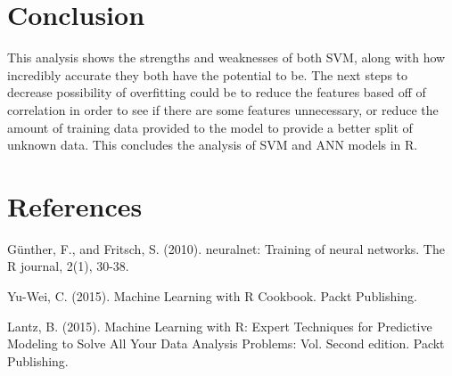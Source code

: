\documentclass[
  english,
  man]{apa6}
\begin{document}
\hypertarget{conclusion}{%
\section{Conclusion}\label{conclusion}}

This analysis shows the strengths and weaknesses of both SVM, along with how incredibly accurate they both have the potential to be. The next steps to decrease possibility of overfitting could be to reduce the features based off of correlation in order to see if there are some features unnecessary, or reduce the amount of training data provided to the model to provide a better split of unknown data. This concludes the analysis of SVM and ANN models in R.

\newpage

\hypertarget{references}{%
\section{References}\label{references}}

Günther, F., and Fritsch, S. (2010). neuralnet: Training of neural networks. The R journal, 2(1), 30-38.

Yu-Wei, C. (2015). Machine Learning with R Cookbook. Packt Publishing.

Lantz, B. (2015). Machine Learning with R: Expert Techniques for Predictive Modeling to Solve All Your Data Analysis Problems: Vol. Second edition. Packt Publishing.

\begingroup
\setlength{\parindent}{-0.5in}
\setlength{\leftskip}{0.5in}

\hypertarget{refs}{}

\endgroup
\end{document}
